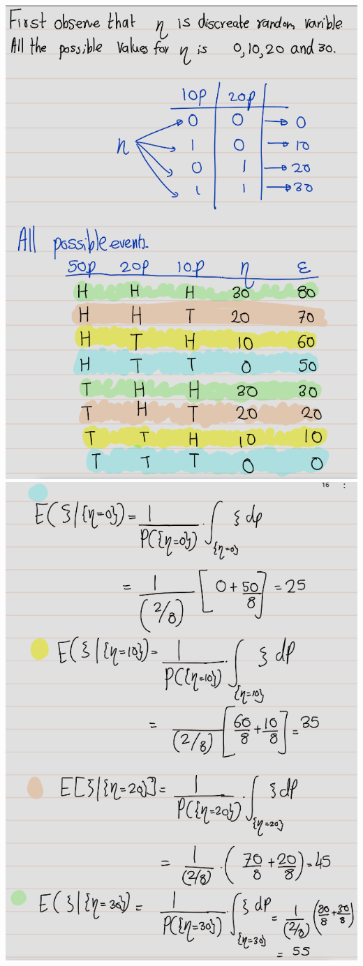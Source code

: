 \documentclass[
]{book}
\theoremstyle{definition}
\theoremstyle{definition}
\theoremstyle{definition}
\theoremstyle{definition}
\theoremstyle{remark}
\begin{document}
\includegraphics[width=18cm,height=\textheight]{fig/fig eg2.2-1.png}
\includegraphics[width=18cm,height=\textheight]{fig/fig eg2.2-2.png}
\end{document}
